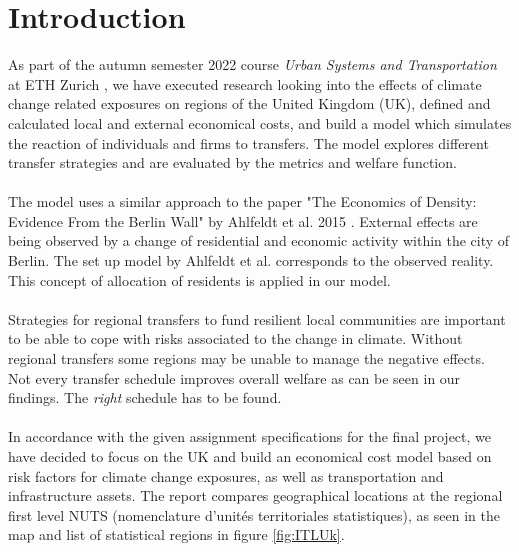 \documentclass[10pt,a4paper]{article}
\begin{document}
\section{Introduction}
As part of the autumn semester 2022 course \textit{Urban Systems and Transportation} at ETH Zurich \cite{course}, we have executed research looking into the effects of climate change related exposures on regions of the United Kingdom (UK), defined and calculated local and external economical costs, and build a model which simulates the reaction of individuals and firms to transfers. The model explores different transfer strategies and are evaluated by the metrics and welfare function. \\\\
The model uses a similar approach to the paper "The Economics of Density:
Evidence From the Berlin Wall" by Ahlfeldt et al. 2015 \cite{ahlfeldt2015economics}. External effects are being observed by a change of residential and economic activity within the city of Berlin. The set up model by Ahlfeldt et al. corresponds to the observed reality. This concept of allocation of residents is applied in our model.
\\\\
Strategies for regional transfers to fund resilient local communities are important to be able to cope with risks associated to the change in climate. Without regional transfers some regions may be unable to manage the negative effects. Not every transfer schedule improves overall welfare as can be seen in our findings. The \textit{right} schedule has to be found.
\\\\
In accordance with the given assignment specifications for the final project, we have decided to focus on the UK and build an economical cost model based on risk factors for climate change exposures, as well as transportation and infrastructure assets. The report compares geographical locations at the regional first level NUTS (nomenclature d'unités territoriales statistiques)\cite{2022firstlevel,2022international}, as seen in the map and list of statistical regions in figure \ref{fig:ITLUk}.\\
\end{document}

